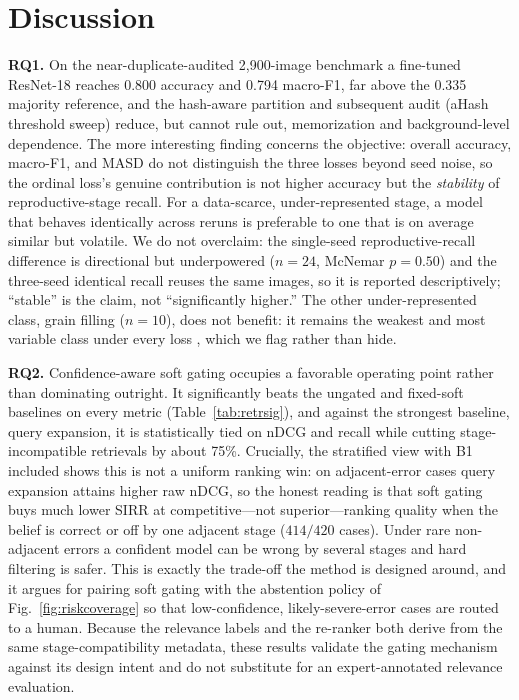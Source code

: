 \documentclass[conference]{IEEEtran}
\begin{document}


\section{Discussion}

\textbf{RQ1.} On the near-duplicate-audited 2{,}900-image benchmark a fine-tuned ResNet-18 reaches 0.800 accuracy and 0.794 macro-F1, far above the 0.335 majority reference, and the hash-aware partition and subsequent audit (aHash threshold sweep) reduce, but cannot rule out, memorization and background-level dependence. The more interesting finding concerns the objective: overall accuracy, macro-F1, and MASD do not distinguish the three losses beyond seed noise, so the ordinal loss's genuine contribution is not higher accuracy but the \emph{stability} of reproductive-stage recall. For a data-scarce, under-represented stage, a model that behaves identically across reruns is preferable to one that is on average similar but volatile. We do not overclaim: the single-seed reproductive-recall difference is directional but underpowered ($n=24$, McNemar $p=0.50$) and the three-seed identical recall reuses the same images, so it is reported descriptively; ``stable'' is the claim, not ``significantly higher.'' The other under-represented class, grain filling ($n=10$), does not benefit: it remains the weakest and most variable class under every loss , which we flag rather than hide.

\textbf{RQ2.} Confidence-aware soft gating occupies a favorable operating point rather than dominating outright. It significantly beats the ungated and fixed-soft baselines on every metric (Table~\ref{tab:retrsig}), and against the strongest baseline, query expansion, it is statistically tied on nDCG and recall while cutting stage-incompatible retrievals by about 75\%. Crucially, the stratified view with B1 included shows this is not a uniform ranking win: on adjacent-error cases query expansion attains higher raw nDCG, so the honest reading is that soft gating buys much lower SIRR at competitive---not superior---ranking quality when the belief is correct or off by one adjacent stage ($414/420$ cases). Under rare non-adjacent errors a confident model can be wrong by several stages and hard filtering is safer. This is exactly the trade-off the method is designed around, and it argues for pairing soft gating with the abstention policy of Fig.~\ref{fig:riskcoverage} so that low-confidence, likely-severe-error cases are routed to a human. Because the relevance labels and the re-ranker both derive from the same stage-compatibility metadata, these results validate the gating mechanism against its design intent and do not substitute for an expert-annotated relevance evaluation.
\end{document}
